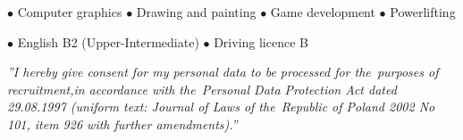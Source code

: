 \documentclass[11pt,a4paper]{article}
\begin{document}
    \bigskip


    \smallskip
    $\bullet$ Computer graphics
    \hspace{0.34cm}
    $\bullet$ Drawing and painting
    \hspace{0.34cm}
    $\bullet$ Game development
    \hspace{0.34cm}
    $\bullet$ Powerlifting

  
    \vspace{0.5cm}
  
    \medskip
    \centerline{
        \hfill
        $\bullet$ English B2 (Upper-Intermediate)
        \hfill
        $\bullet$ Driving licence B
        \hfill
    }
  
  
    \vspace{0.92cm}
    \noindent \textit{''I hereby give consent for my personal data to be processed for the~purposes
    of recruitment,\linebreak in accordance with the~Personal Data Protection Act dated 29.08.1997
    (uniform text: Journal of Laws of the~Republic of Poland 2002 No 101, item 926
    with further amendments).''}
\end{document}
